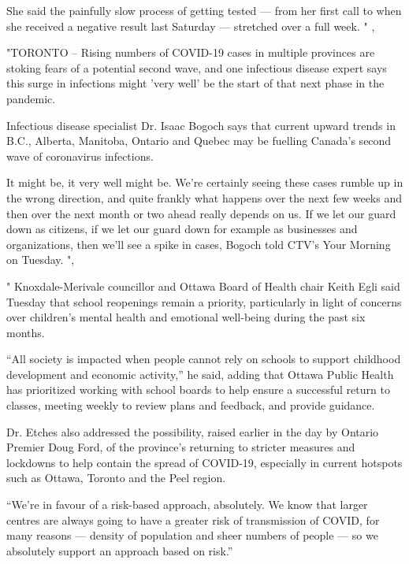 \documentclass[]{article}
\newenvironment{Shaded}{\begin{snugshade}}{\end{snugshade}}
\newcommand{\NormalTok}[1]{#1}
\newcommand{\StringTok}[1]{\textcolor[rgb]{0.31,0.60,0.02}{#1}}
\begin{document}
\begin{Shaded}
\begin{Highlighting}[]
\StringTok{She said the painfully slow process of getting tested — from her first call to when she received a negative result last Saturday — stretched over a full week. }
\StringTok{"}\NormalTok{ ,}

\StringTok{"TORONTO -- Rising numbers of COVID-19 cases in multiple provinces are stoking fears of a potential second wave, and one infectious disease expert says this surge in infections might 'very well' be the start of that next phase in the pandemic.}

\StringTok{Infectious disease specialist Dr. Isaac Bogoch says that current upward trends in B.C., Alberta, Manitoba, Ontario and Quebec may be fuelling Canada’s second wave of coronavirus infections.}

\StringTok{It might be, it very well might be. We're certainly seeing these cases rumble up in the wrong direction, and quite frankly what happens over the next few weeks and then over the next month or two ahead really depends on us. If we let our guard down as citizens, if we let our guard down for example as businesses and organizations, then we'll see a spike in cases, Bogoch told CTV's Your Morning on Tuesday.}
\StringTok{"}\NormalTok{, }

\StringTok{"}
\StringTok{Knoxdale-Merivale councillor and Ottawa Board of Health chair Keith Egli said Tuesday that school reopenings remain a priority, particularly in light of concerns over children’s mental health and emotional well-being during the past six months.}

\StringTok{“All society is impacted when people cannot rely on schools to support childhood development and economic activity,” he said, adding that Ottawa Public Health has prioritized working with school boards to help ensure a successful return to classes, meeting weekly to review plans and feedback, and provide guidance.}

\StringTok{Dr. Etches also addressed the possibility, raised earlier in the day by Ontario Premier Doug Ford, of the province’s returning to stricter measures and lockdowns to help contain the spread of COVID-19, especially in current hotspots such as Ottawa, Toronto and the Peel region.}

\StringTok{“We’re in favour of a risk-based approach, absolutely. We know that larger centres are always going to have a greater risk of transmission of COVID, for many reasons — density of population and sheer numbers of people — so we absolutely support an approach based on risk.”}


\end{Highlighting}
\end{Shaded}
\end{document}
